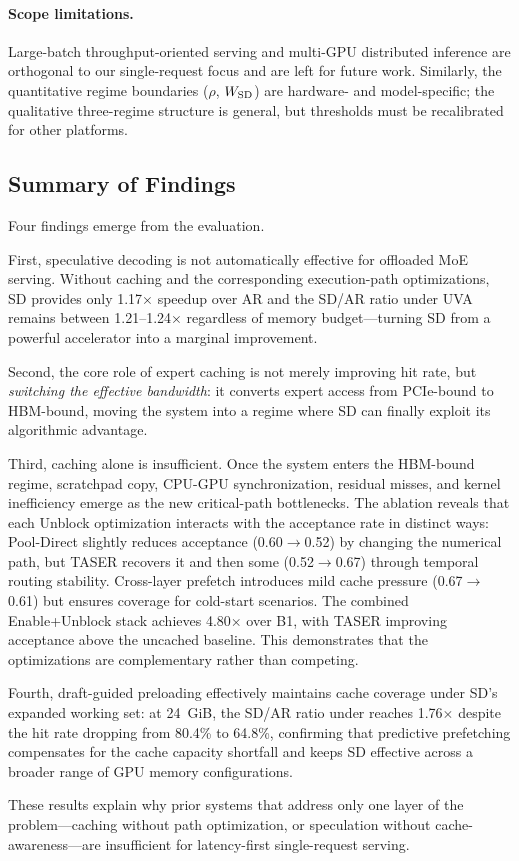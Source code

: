 \paragraph{Scope limitations.}
Large-batch throughput-oriented serving and multi-GPU distributed inference are orthogonal to our single-request focus and are left for future work. Similarly, the quantitative regime boundaries ($\rho$, $W_{\mathrm{SD}}$) are hardware- and model-specific; the qualitative three-regime structure is general, but thresholds must be recalibrated for other platforms.

\subsection{Summary of Findings}

Four findings emerge from the evaluation.

First, speculative decoding is not automatically effective for offloaded MoE serving. Without caching and the corresponding execution-path optimizations, SD provides only 1.17$\times$ speedup over AR and the SD/AR ratio under UVA remains between 1.21--1.24$\times$ regardless of memory budget---turning SD from a powerful accelerator into a marginal improvement.

Second, the core role of expert caching is not merely improving hit rate, but \emph{switching the effective bandwidth}: it converts expert access from PCIe-bound to HBM-bound, moving the system into a regime where SD can finally exploit its algorithmic advantage.

Third, caching alone is insufficient. Once the system enters the HBM-bound regime, scratchpad copy, CPU-GPU synchronization, residual misses, and kernel inefficiency emerge as the new critical-path bottlenecks. The ablation reveals that each Unblock optimization interacts with the acceptance rate in distinct ways: Pool-Direct slightly reduces acceptance (0.60$\to$0.52) by changing the numerical path, but TASER recovers it and then some (0.52$\to$0.67) through temporal routing stability. Cross-layer prefetch introduces mild cache pressure (0.67$\to$0.61) but ensures coverage for cold-start scenarios. The combined Enable+Unblock stack achieves 4.80$\times$ over B1, with TASER improving acceptance above the uncached baseline. This demonstrates that the optimizations are complementary rather than competing.

Fourth, draft-guided preloading effectively maintains cache coverage under SD's expanded working set: at 24~GiB, the SD/AR ratio under \sysname reaches 1.76$\times$ despite the hit rate dropping from 80.4\% to 64.8\%, confirming that predictive prefetching compensates for the cache capacity shortfall and keeps SD effective across a broader range of GPU memory configurations.

These results explain why prior systems that address only one layer of the problem---caching without path optimization, or speculation without cache-awareness---are insufficient for latency-first single-request serving.